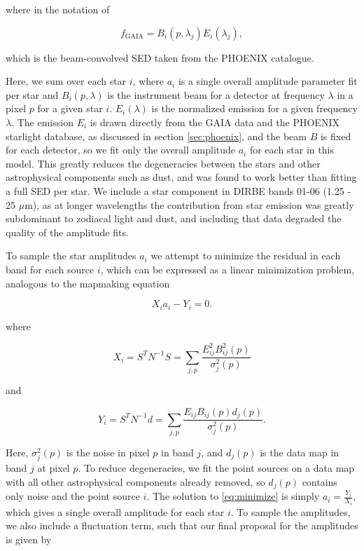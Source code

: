 \documentclass{aa}
\begin{document}
where in the notation of \cite{CG02_01} 

\begin{equation}
f_{\mathrm{GAIA}} = B_i(p, \lambda_j) E_i(\lambda_j),
\end{equation}

which is the beam-convolved SED taken from the PHOENIX catalogue.

Here, we sum over each star $i$, where $a_i$ is a single overall amplitude parameter fit per star and $B_i(p, \lambda)$ is the instrument beam for a detector at frequency $\lambda$ in a pixel $p$ for a given star $i$. $E_i(\lambda)$ is the normalized emission for a given frequency $\lambda$. The emission $E_i$ is drawn directly from the GAIA data and the PHOENIX starlight database, as discussed in section \ref{sec:phoenix}, and the beam $B$ is fixed for each detector, so we fit only the overall amplitude $a_i$ for each star in this model. This greatly reduces the degeneracies between the stars and other astrophysical components such as dust, and was found to work better than fitting a full SED per star. We include a star component in DIRBE bands 01-06 (1.25 - 25 $\mu$m), as at longer wavelengths the contribution from star emission was greatly subdominant to zodiacal light and dust, and including that data degraded the quality of the amplitude fits. 

To sample the star amplitudes $a_i$ we attempt to minimize the residual in each band for each source $i$, which can be expressed as a linear minimization problem, analogous to the mapmaking equation

\begin{equation}
\label{eq:minimize}
X_ia_i - Y_i = 0.
\end{equation}

where

\begin{equation}
X_i = S^T N^{-1} S = \sum_{j,p}\frac{E_{ij}^2 B^2_{ij}(p)}{\sigma_j^2(p)} 
\end{equation}

and

\begin{equation}
Y_i = S^TN^{-1}d = \sum_{j,p} \frac{E_{ij}B_{ij}(p) d_j(p)}{\sigma_j^2(p)}.
\end{equation}

Here, $\sigma_j^2(p)$ is the noise in pixel $p$ in band $j$, and $d_j(p)$ is the data map in band $j$ at pixel $p$. To reduce degeneracies, we fit the point sources on a data map with all other astrophysical components already removed, so $d_j(p)$ contains only noise and the point source $i$. The solution to \ref{eq:minimize} is simply $a_i = \frac{Y_i}{X_i}$, which gives a single overall amplitude for each star $i$. To sample the amplitudes, we also include a fluctuation term, such that our final proposal for the amplitudes is given by
\end{document}
